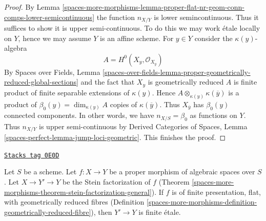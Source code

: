\begin{proof}
By Lemma \ref{spaces-more-morphisms-lemma-proper-flat-nr-geom-conn-comps-lower-semicontinuous}
the function $n_{X/Y}$ is lower semincontinuous.
Thus it suffices to show it is upper semi-continuous.
To do this we may work \'etale locally on $Y$, hence we
may assume $Y$ is an affine scheme.
For $y \in Y$ consider the $\kappa(y)$-algebra
$$
A = H^0(X_y, \mathcal{O}_{X_y})
$$
By Spaces over Fields, Lemma
\ref{spaces-over-fields-lemma-proper-geometrically-reduced-global-sections}
and the fact that $X_y$ is geometrically reduced
$A$ is finite product of finite separable extensions of $\kappa(y)$.
Hence $A \otimes_{\kappa(y)} \kappa(\overline{y})$ is a product
of $\beta_0(y) = \dim_{\kappa(y)} A$ copies of $\kappa(\overline{y})$.
Thus $X_{\overline{y}}$ has $\beta_0(y)$ connected components.
In other words, we have $n_{X/S} = \beta_0$ as functions on $Y$.
Thus $n_{X/Y}$ is upper semi-continuous by
Derived Categories of Spaces, Lemma
\ref{spaces-perfect-lemma-jump-loci-geometric}.
This finishes the proof.
\end{proof}

\begin{lemma}
\label{spaces-more-morphisms-lemma-stein-factorization-etale}
\href{https://stacks.math.columbia.edu/tag/0E0D}{\texttt{Stacks tag 0E0D}}

Let $S$ be a scheme.
Let $f : X \to Y$ be a proper morphism of algebraic spaces over $S$.
Let $X \to Y' \to Y$ be the Stein factorization of $f$
(Theorem \ref{spaces-more-morphisms-theorem-stein-factorization-general}).
If $f$ is of finite presentation, flat, with geometrically
reduced fibres (Definition \ref{spaces-more-morphisms-definition-geometrically-reduced-fibre}),
then $Y' \to Y$ is finite \'etale.
\end{lemma}

